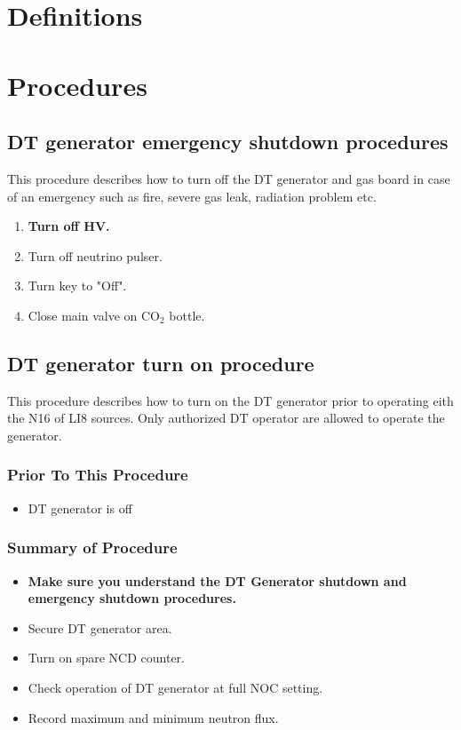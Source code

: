\documentclass[10pt]{article}
\begin{document}
\section{Definitions}

\section{Procedures}

\subsection{ DT generator emergency shutdown procedures}

This procedure describes how to turn off the DT generator and gas board in case of an emergency such as fire, severe gas leak, radiation problem etc.
\begin{enumerate}
\item \CheckBox[name=dtesp1]{} {\bf Turn off HV.}
\item \CheckBox[name=dtesp2]{} Turn off neutrino pulser.
\item \CheckBox[name=dtesp3]{} Turn key to "Off".
\item \CheckBox[name=dtesp4]{} Close main valve on CO$_2$ bottle.
\end{enumerate}

\pagebreak
\subsection{ DT generator turn on procedure}

This procedure describes how to turn on the DT generator prior to operating eith the N16 of LI8 sources. Only authorized DT operator are allowed to operate the generator.
\subsubsection{Prior To This Procedure}
\begin{itemize}
\item \CheckBox[name=dttop01]{} DT generator is off
\end{itemize}
\subsubsection{Summary of Procedure}
\begin{itemize}
\item \CheckBox[name=dttop02]{} {\bf Make sure you understand the DT Generator shutdown and emergency shutdown procedures.}
\item \CheckBox[name=dttop03]{} Secure DT generator area.
\item \CheckBox[name=dttop04]{} Turn on spare NCD counter.
\item \CheckBox[name=dttop05]{} Check operation of DT generator at full NOC setting.
\item \CheckBox[name=dttop06]{} Record maximum and minimum neutron flux.
\end{itemize}
\end{document}
